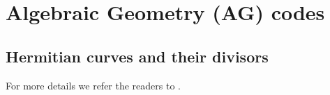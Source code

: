\documentclass[a4paper]{amsart}
\theoremstyle{plain}
\theoremstyle{definition}
\theoremstyle{remark}
\begin{document}
\section{Algebraic Geometry (AG) codes}

\subsection*{Hermitian curves and their divisors}

For more details we refer the readers to \cite{stichtenoth2009algebraic, stepanov2012codes}.

%	
%	
%	
%	
%	
%	
%	
%	
\end{document}
